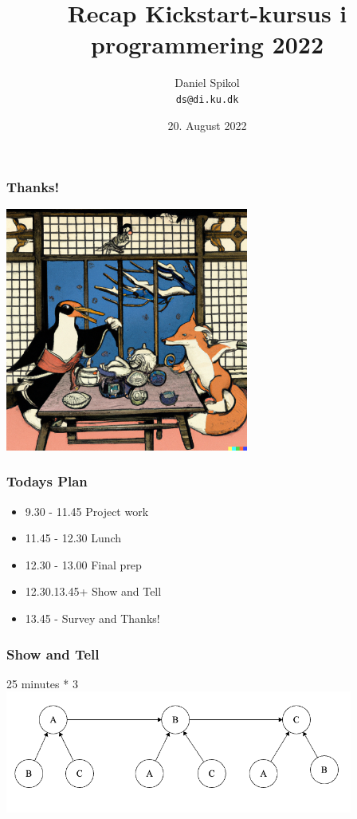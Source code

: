 \documentclass[10pt]{beamer}
\title[Kickstart-kursus] %
  {Recap Kickstart-kursus i programmering 2022} %
\author{\footnotesize{Daniel Spikol} \\
          \footnotesize{\texttt{ds@di.ku.dk}}}
\institute {
DIKU \\ Københavns Universitet
}
\date[August 2022]{20. August 2022}
\begin{document}
\begin{frame}
  \maketitle
\end{frame}

\begin{frame}
   \frametitle{Thanks!}
   	 \includegraphics[height=8cm]{images/bye22}
\end{frame}

\begin{frame}
\frametitle{Todays Plan}
\begin{itemize}
\item 9.30 - 11.45 Project work
\item 11.45 - 12.30 Lunch
\item 12.30 - 13.00 Final prep
\item 12.30.13.45+ Show and Tell
\item 13.45 - Survey and Thanks!
\end{itemize}
\end{frame}

\begin{frame}
   \frametitle{Show and Tell}
   25 minutes * 3 
   	\includegraphics[height=4cm]{images/showtell}
\end{frame}
\end{document}

